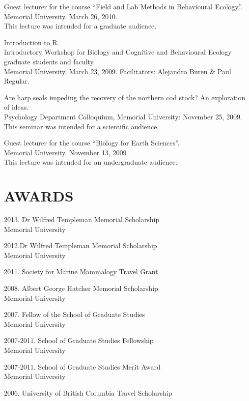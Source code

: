 \documentclass{res}
\begin{document}
\begin{resume}
Guest lecturer for the course “Field and Lab Methods in Behavioural Ecology”.\\ Memorial University. March 26, 2010. \\
This lecture was intended for a graduate audience.

Introduction to R.\\ Introductory Workshop for Biology and Cognitive and Behavioural Ecology graduate students and faculty. \\Memorial University, March 23, 2009. Facilitators: Alejandro Buren \& Paul Regular.


Are harp seals impeding the recovery of the northern cod stock? An exploration of ideas.\\
Psychology Department Colloquium, Memorial University: November 25, 2009. \\
This seminar was intended for a scientific audience.

Guest lecturer for the course “Biology for Earth Sciences”. \\Memorial University. November 13, 2009 \\
This lecture was intended for an undergraduate audience.
	

\section{AWARDS}
\vspace{0.1in} 
\begin{hangparas}{.4in}{1}
2013. Dr Wilfred Templeman Memorial Scholarship\\
Memorial University

2012.Dr Wilfred Templeman Memorial Scholarship\\
Memorial University

2011. Society for Marine Mammalogy Travel Grant

2008. Albert George Hatcher Memorial Scholarship\\
Memorial University

2007. Fellow of the School of Graduate Studies\\
Memorial University

2007-2011. 
School of Graduate Studies Fellowship \\
Memorial University

2007-2011. School of Graduate Studies Merit Award\\
Memorial University

2006. University of British Columbia Travel Scholarship


\end{hangparas}
\end{resume}
\end{document}
